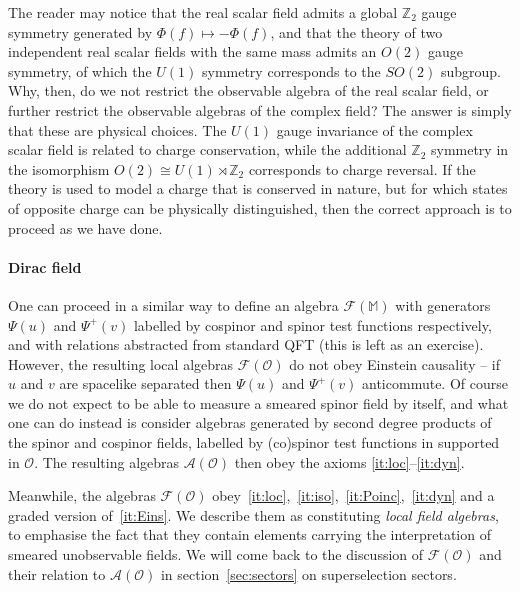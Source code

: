 \documentclass[12pt]{article}
\newcommand{\1}{\mathds{1}}                         %
\newcommand{\ZZ}{\mathbb{Z}} %
\newcommand{\Ocal}{\mathcal{O}}
\newcommand{\MM}{\mathbb{M}}
\newcommand{\Ac}{{\mathcal{A}}}
\newcommand{\Fc}{{\mathcal{F}}}
\begin{document}
	The reader may notice that the real scalar field admits a global $\ZZ_2$ gauge symmetry generated by $\Phi(f)\mapsto -\Phi(f)$, and that the theory of two independent real scalar fields with the same mass admits an $O(2)$ gauge symmetry, of which the $U(1)$ symmetry corresponds to the $SO(2)$ subgroup. Why, then, do we not restrict the observable algebra of the real scalar field, or further restrict the observable algebras of the complex field? The answer is simply that these are physical choices. The $U(1)$ gauge invariance of the complex scalar field is related to charge conservation, while the additional $\ZZ_2$ symmetry
	in the isomorphism $O(2)\cong U(1)\rtimes \ZZ_2$ 
	corresponds to charge reversal. If the theory is used to model a charge that is conserved in nature, but for which states of opposite charge can be physically distinguished, then the correct approach is to proceed as we have done. 
	
	\paragraph{Dirac field} One can proceed in a similar way to define an algebra $\Fc(\MM)$ with generators $\Psi(u)$ and $\Psi^+(v)$ labelled by cospinor and spinor test 
	functions respectively, and with relations abstracted from standard QFT (this is left as an exercise). However, the resulting local algebras $\Fc(\Ocal)$ do not obey Einstein causality -- if $u$ and $v$ are spacelike separated then $\Psi(u)$ and $\Psi^+(v)$ anticommute. Of course we do not expect to be able to measure a smeared spinor field by itself, and what one can do instead is consider algebras generated by second degree products of the spinor and cospinor fields, labelled by (co)spinor test functions in supported in $\Ocal$. The resulting algebras $\Ac(\Ocal)$ then obey the axioms \ref{it:loc}--\ref{it:dyn}. 
	
	Meanwhile, the algebras $\Fc(\Ocal)$ obey~\ref{it:loc},~\ref{it:iso},~\ref{it:Poinc},~\ref{it:dyn} and a graded version of~\ref{it:Eins}. We describe them as constituting \emph{local field algebras}, to emphasise the fact that they contain elements carrying the
	interpretation of smeared unobservable fields. We will come back to the discussion of $\Fc(\Ocal)$ and their relation to $\Ac(\Ocal)$ in section~\ref{sec:sectors} on superselection sectors.  
	
%	
%	
\end{document}
